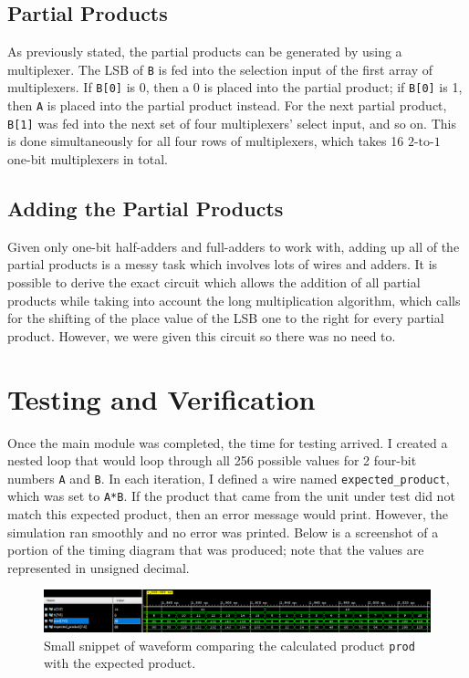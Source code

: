 \documentclass{article}
\renewcommand{\c}[1]{\texttt{#1}}
\begin{document}
\subsection{Partial Products} As previously stated,
the partial products can be generated by using a multiplexer.
The LSB of \c{B} is fed into the
selection input of the
first array of multiplexers. If
\c{B[0]} is \num{0}, then a \num{0} is placed into the
partial product; if \c{B[0]} is \num{1}, then \c{A} is
placed into the partial product instead.
For the next partial product, \c{B[1]} was fed into the next set of four
multiplexers' select input, and so on.
This is done
simultaneously for all
four rows of multiplexers,
which takes \num{16}
\(2\text{-to-}1\) one-bit multiplexers in total.

\subsection{Adding the Partial Products} Given only one-bit
half-adders and full-adders to work with, adding up all of
the partial products is a messy task which involves lots of
wires and adders. It is possible to derive the exact circuit
which allows the addition of all partial products while taking
into account the long multiplication algorithm, which calls
for the shifting of the place value of the LSB one to the right
for every partial product. However, we were given this circuit
so there was no need to.

\section{Testing and Verification} Once the main module was
completed, the time for testing arrived. I created a nested loop
that would loop through all \num{256} possible values
for \num{2} four-bit numbers \c{A} and \c{B}. In each iteration,
I defined a wire named \c{expected\_product}, which
was set to \c{A*B}. If the product that came from the
unit under test did not match this expected product, then
an error message would print. However, the simulation
ran smoothly and no error was printed. Below is a screenshot
of a portion of the timing diagram that was produced; note
that the values are represented in unsigned decimal.

\begin{figure}[h]
    \centering
    \includegraphics[width=\textwidth]{Images/waveform.png}
    \caption{Small snippet of waveform comparing the calculated product \c{prod} with the expected product.}
\end{figure}
\end{document}
